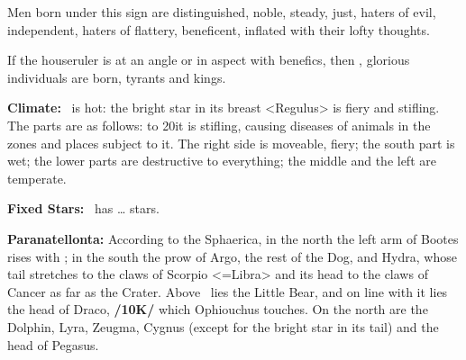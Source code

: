 Men born under this sign are distinguished, noble, steady, just, haters of evil, independent, haters of flattery, beneficent, inflated with their lofty thoughts. 

\mndl[0.2cm]
If the houseruler is at an angle or in aspect with benefics, then , glorious individuals are born, tyrants and kings.

\textbf{Climate:} \Leo\, is hot: the bright star in its breast <Regulus> is fiery and stifling. The parts are as follows: to 20\deg it is stifling, causing diseases of animals in the zones and places subject to it. The right side is moveable, fiery; the south part is wet; the lower parts are destructive to everything; the middle and the left are temperate.

\textbf{Fixed Stars:} \Leo\, has … stars. 

\textbf{Paranatellonta:} According to the Sphaerica, in the north the left arm of Bootes rises with \Leo; in the south the prow of Argo, the rest of the Dog, and Hydra, whose tail stretches to the claws of Scorpio <=Libra> and its head to the claws of Cancer as far as the Crater. Above \Leo\, lies the Little Bear, and on line with it lies the head of Draco, \textbf{/10K/} which Ophiouchus touches. On the north are the Dolphin, Lyra, Zeugma, Cygnus (except for the bright star in its tail) and the head of Pegasus.

